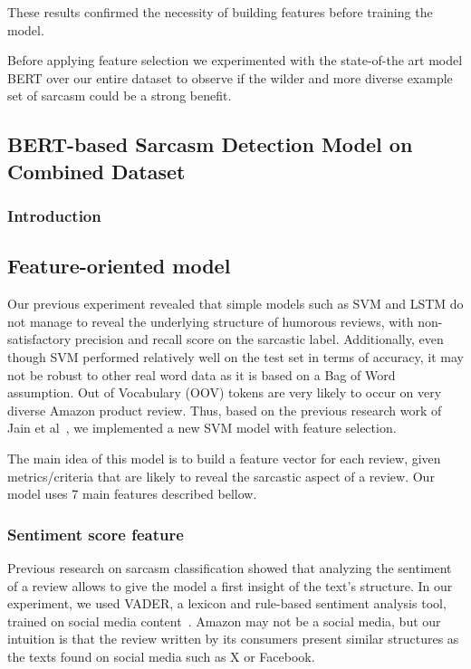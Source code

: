 \documentclass[10pt,twocolumn,letterpaper]{article}
\begin{document}
These results confirmed the necessity of building features before training the model.

Before applying feature selection we experimented with the state-of-the art model BERT over our entire dataset to observe if the wilder and more diverse example set of sarcasm could be a strong benefit.
\subsection{BERT-based Sarcasm Detection Model on Combined Dataset}
\subsubsection{Introduction}
\subsection{Feature-oriented model}

Our previous experiment revealed that simple models such as SVM and LSTM do not manage to reveal the underlying structure of humorous reviews, with non-satisfactory precision and recall score on the sarcastic label.
Additionally, even though SVM performed relatively well on the test set in terms of accuracy, it may not be robust to other real word data as it is based on a Bag of Word assumption. Out of Vocabulary (OOV) tokens are very likely to occur on very diverse Amazon product review.
Thus, based on the previous research work of Jain et al~\cite{jain2019}, we implemented a new SVM model with feature selection.

The main idea of this model is to build a feature vector for each review, given metrics/criteria that are likely to reveal the sarcastic aspect of a review.
Our model uses 7 main features described bellow.

\subsubsection{Sentiment score feature}

Previous research on sarcasm classification showed that analyzing the sentiment of a review allows to give the model a first insight of the text's structure.
In our experiment, we used VADER, a lexicon and rule-based sentiment analysis tool, trained on social media content~\cite{icwsm2014}.
Amazon may not be a social media, but our intuition is that the review written by its consumers present similar structures as the texts found on social media such as X or Facebook.
\end{document}
